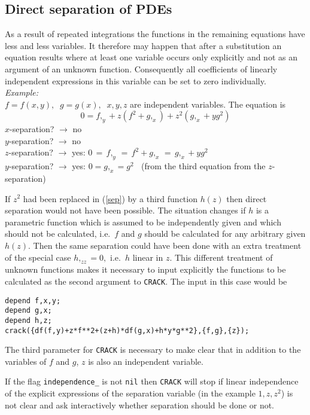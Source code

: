 \subsection{Direct separation of PDEs}
As a result of repeated integrations the functions in the
remaining equations have less and less variables. It therefore may happen
that after a substitution an equation results where at least one variable
occurs only explicitly and not as an argument of an unknown function.
Consequently all coefficients of linearly independent expressions in this
variable can be set to zero individually. \\

{\em Example:}  \\
$f = f(x,y), \;\; g = g(x), \;\; x,y,z$ are independent variables.
The equation is
\begin{equation}
0 = f,_y + z(f^2+g,_x) + z^2(g,_x+yg^2) \label{sep}
\end{equation}
$x$-separation? $\rightarrow$ no  \\
$y$-separation? $\rightarrow$ no  \\
$z$-separation? $\rightarrow$ yes: $0 \,=\, f,_y \,=\, f^2+g,_x \,=\,
g,_x+yg^2$ \\
$y$-separation? $\rightarrow$ yes: $0 = g,_x = g^2\;\;$
(from the third equation from the $z$-separation)

If $z^2$ had been replaced in (\ref{sep}) by a third
function $h(z)$ then direct separation would not have been possible.
The situation changes if $h$ is a parametric function which is
assumed to be independently given and which should not be
calculated, i.e.\ $f$ and $g$ should be calculated for any
arbitrary given $h(z)$. Then the same separation could have been
done with an extra treatment of the special case $h,_{zz} = 0,$
i.e.\ $h$ linear in $z$. This different treatment of unknown functions
makes it necessary to input explicitly the functions to be
calculated as the second argument to {\tt CRACK}. The input
in this case would be
\begin{verbatim}
depend f,x,y;
depend g,x;
depend h,z;
crack({df(f,y)+z*f**2+(z+h)*df(g,x)+h*y*g**2},{f,g},{z});
\end{verbatim}
The third parameter for {\tt CRACK} is necessary to make clear that
in addition to the variables of $f$ and $g$, $z$ is also an independent
variable.

If the flag {\tt independence\_} is not {\tt nil} then {\tt CRACK} will
stop if linear independence of the explicit expressions of the
separation variable (in the example $1,z,z^2$) is not clear and ask
interactively whether separation should be done or not.

